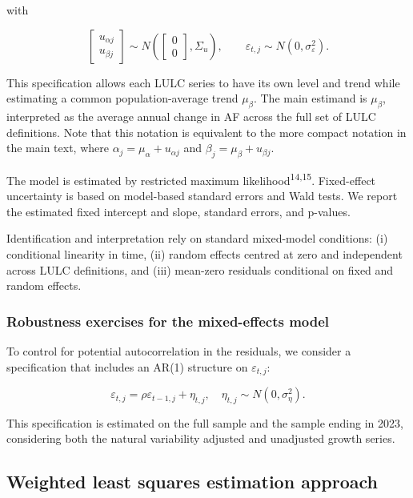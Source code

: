 \documentclass[
  12pt,
  letterpaper,
  DIV=11,
  numbers=noendperiod]{scrartcl}
\begin{document}
with

\[
\begin{bmatrix}u_{\alpha j} \\ u_{\beta j}\end{bmatrix}
\sim N\!\left(
\begin{bmatrix}0\\0\end{bmatrix},
\Sigma_u
\right),
\qquad
\varepsilon_{t,j} \sim N(0,\sigma_\varepsilon^2).
\]

This specification allows each LULC series to have its own level and
trend while estimating a common population-average trend \(\mu_\beta\).
The main estimand is \(\mu_\beta\), interpreted as the average annual
change in AF across the full set of LULC definitions. Note that this
notation is equivalent to the more compact notation in the main text,
where \(\alpha_j = \mu_\alpha + u_{\alpha j}\) and
\(\beta_j = \mu_\beta + u_{\beta j}\).

The model is estimated by restricted maximum
likelihood\textsuperscript{14,15}. Fixed-effect uncertainty is based on
model-based standard errors and Wald tests. We report the estimated
fixed intercept and slope, standard errors, and p-values.

Identification and interpretation rely on standard mixed-model
conditions: (i) conditional linearity in time, (ii) random effects
centred at zero and independent across LULC definitions, and (iii)
mean-zero residuals conditional on fixed and random effects.

\subsubsection*{Robustness exercises for the mixed-effects
model}\label{robustness-exercises-for-the-mixed-effects-model}

To control for potential autocorrelation in the residuals, we consider a
specification that includes an AR(1) structure on \(\varepsilon_{t,j}\):

\[
\varepsilon_{t,j} = \rho \varepsilon_{t-1,j} + \eta_{t,j}, \quad \eta_{t,j} \sim N(0,\sigma_\eta^2).
\]

This specification is estimated on the full sample and the sample ending
in 2023, considering both the natural variability adjusted and
unadjusted growth series.

\subsection*{Weighted least squares estimation
approach}\label{weighted-least-squares-estimation-approach}
\end{document}
